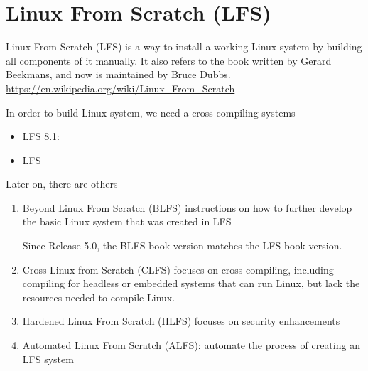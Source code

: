 \section{Linux From Scratch (LFS)}
\label{sec:LFS}

Linux From Scratch (LFS) is a way to install a working Linux system by building
all components of it manually. It also refers to the book written by  Gerard
Beekmans, and now is maintained by  Bruce Dubbs.
\url{https://en.wikipedia.org/wiki/Linux_From_Scratch}

In order to build Linux system, we need a cross-compiling systems
\begin{itemize}
  \item LFS 8.1: 
  
  \item LFS 
\end{itemize}

Later on, there are others
\begin{enumerate}
  \item  Beyond Linux From Scratch (BLFS) 
   instructions on how to further develop the basic Linux system that was
  created in LFS
  
  Since Release 5.0, the BLFS book version matches the LFS book version.
  
  \item Cross Linux from Scratch (CLFS) focuses on cross compiling, including
  compiling for headless or embedded systems that can run Linux, but lack the
  resources needed to compile Linux.
  
  \item Hardened Linux From Scratch (HLFS) focuses on security enhancements
  
  \item Automated Linux From Scratch (ALFS): automate the process of creating an
  LFS system
\end{enumerate}
